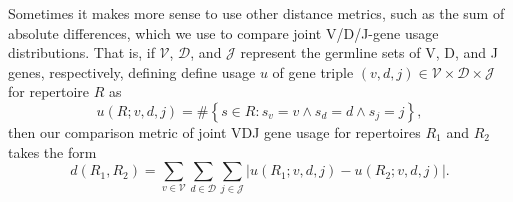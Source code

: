\documentclass{article}
\begin{document}
Sometimes it makes more sense to use other distance metrics, such as the sum of absolute differences, which we use to compare joint V/D/J-gene usage distributions.
That is, if $\mathcal V$, $\mathcal D$, and $\mathcal J$ represent the germline sets of V, D, and J genes, respectively,
defining define usage $u$ of gene triple $(v, d, j) \in \mathcal V \times \mathcal D \times \mathcal J$ for repertoire $R$ as
\begin{equation}
u(R; v, d, j) = \#\left\{s \in R: s_v = v \land s_d = d \land s_j = j\right\},
\end{equation}
then our comparison metric of joint VDJ gene usage for repertoires $R_1$ and $R_2$ takes the form
\begin{equation}
d(R_1, R_2) = \sum_{v \in \mathcal V} \sum_{d \in \mathcal D} \sum_{j \in \mathcal J} \left| u(R_1; v, d, j) - u(R_2; v, d, j) \right|.
\end{equation}
\end{document}

